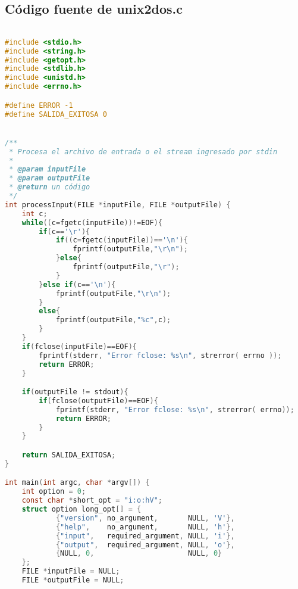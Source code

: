\documentclass[a4paper]{article}
\begin{document}
\subsection{Código fuente de unix2dos.c}
\begin{lstlisting}[language=C]

#include <stdio.h>
#include <string.h>
#include <getopt.h>
#include <stdlib.h>
#include <unistd.h>
#include <errno.h>

#define ERROR -1
#define SALIDA_EXITOSA 0


/**
 * Procesa el archivo de entrada o el stream ingresado por stdin
 *
 * @param inputFile
 * @param outputFile
 * @return un código
 */
int processInput(FILE *inputFile, FILE *outputFile) {
    int c;
    while((c=fgetc(inputFile))!=EOF){
        if(c=='\r'){
            if((c=fgetc(inputFile))=='\n'){
            	fprintf(outputFile,"\r\n");
            }else{
            	fprintf(outputFile,"\r");
            }
        }else if(c=='\n'){
        	fprintf(outputFile,"\r\n");
        }
        else{
            fprintf(outputFile,"%c",c);
        }
    }
    if(fclose(inputFile)==EOF){
        fprintf(stderr, "Error fclose: %s\n", strerror( errno ));
        return ERROR;
    }

    if(outputFile != stdout){
        if(fclose(outputFile)==EOF){
            fprintf(stderr, "Error fclose: %s\n", strerror( errno));
            return ERROR;
        }
    }

    return SALIDA_EXITOSA;
}

int main(int argc, char *argv[]) {
    int option = 0;
    const char *short_opt = "i:o:hV";
    struct option long_opt[] = {
            {"version", no_argument,       NULL, 'V'},
            {"help",    no_argument,       NULL, 'h'},
            {"input",   required_argument, NULL, 'i'},
            {"output",  required_argument, NULL, 'o'},
            {NULL, 0,                      NULL, 0}
    };
    FILE *inputFile = NULL;
    FILE *outputFile = NULL;


\end{lstlisting}
\end{document}
